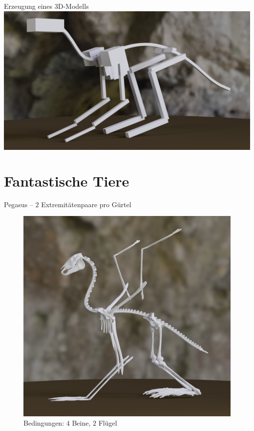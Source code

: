 \documentclass{beamer}
\begin{document}
\begin{frame}{Erzeugung eines 3D-Modells}
 \centering
 \includegraphics[width=\textwidth]{../../java_skeleton_generation/example_skeletons/4legs_boxes.jpg}
\end{frame}

\section{Fantastische Tiere}

\begin{frame}{Pegasus -- $2$ Extremitätenpaare pro Gürtel}
 \begin{figure}
  \centering
  \includegraphics[height=0.75\textheight]{../../java_skeleton_generation/example_skeletons/pegasus.jpg}
  \caption{Bedingungen: $4$ Beine, $2$ Flügel}
 \end{figure}
\end{frame}
\end{document}
